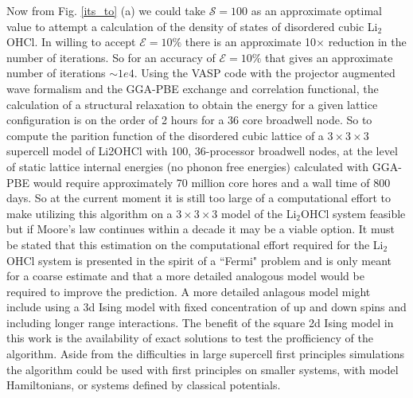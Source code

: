 \documentclass[aps,prl,reprint,superscriptaddress,showkeys]{revtex4-1}
\begin{document}
 Now from Fig. \ref{its_to} (a) we could take $\mathcal{S}=100$  as an approximate optimal value to attempt a calculation of the density of states of disordered cubic Li$_2$OHCl. In willing to accept $\mathcal{E}=10\%$ there is an approximate 10$\times$ reduction in the number of iterations. So for an accuracy of $\mathcal{E}=10\%$ that gives an approximate number of iterations  $\sim 1e4$. Using the VASP code\cite{Vasp1,Vasp2,Vasp3,Vasp4} with the projector augmented wave formalism\cite{Blochl, pawVasp} and the GGA-PBE exchange and correlation functional\cite{PBE,PBEerratum}, the calculation of a structural relaxation to obtain the energy for a given lattice configuration is on the order of 2 hours for a 36 core broadwell node. So to compute the parition function of the disordered cubic lattice of a $3\times 3 \times 3$ supercell model of Li2OHCl with 100,  36-processor broadwell nodes, at the level of static lattice internal energies (no phonon free energies) calculated with GGA-PBE  would require approximately  70 million core hores and a wall time of 800 days.   So at the current moment it is still  too large of a computational effort to make utilizing this algorithm on a $3\times  3 \times 3$ model of the Li$_2$OHCl system feasible but if Moore's law continues within a decade it may be a viable option. It must be stated that this estimation on the computational effort required for the Li$_2$OHCl system is presented in the spirit of a ``Fermi" problem and is only meant for a coarse estimate and that a more detailed analogous model would be required to improve the prediction. A more detailed anlagous model might include using a 3d Ising model with fixed concentration of up and down spins and including longer range interactions. The benefit of the square 2d Ising model in this work is the availability of exact solutions to test the profficiency of the algorithm. Aside from the difficulties in large supercell first principles simulations the algorithm could be used with first principles on smaller systems, with model Hamiltonians, or systems defined by classical potentials.  
\end{document}

